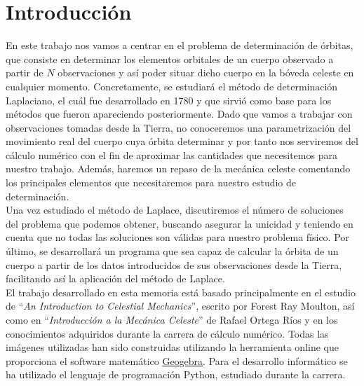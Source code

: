 \documentclass[11pt]{book}
\begin{document}

\thispagestyle{empty}

	\tableofcontents  %
	\thispagestyle{empty}
	\listoffigures    %
	\thispagestyle{empty}

\chapter{Introducción}
\label{chap:introduction}
En este trabajo nos vamos a centrar en el problema de determinación de órbitas, que consiste en determinar los elementos orbitales de un cuerpo observado a partir de $N$ observaciones y así poder situar dicho cuerpo en la bóveda celeste en cualquier momento. Concretamente, se estudiará el método de determinación Laplaciano, el cuál fue desarrollado en 1780 y que sirvió como base para los métodos que fueron apareciendo posteriormente.	Dado que vamos a trabajar con observaciones tomadas desde la Tierra, no conoceremos una parametrización del movimiento real del cuerpo cuya órbita determinar y por tanto nos serviremos del cálculo numérico con el fin de aproximar las cantidades que necesitemos para nuestro trabajo. Además, haremos un repaso de la mecánica celeste comentando los principales elementos que necesitaremos para nuestro estudio de determinación.\\

Una vez estudiado el método de Laplace, discutiremos el número de soluciones del problema que podemos obtener, buscando asegurar la unicidad y teniendo en cuenta que no todas las soluciones son válidas para nuestro problema físico. Por último, se desarrollará un programa que sea capaz de calcular la órbita de un cuerpo a partir de los datos introducidos de sus observaciones desde la Tierra, facilitando así la aplicación del método de Laplace.\\

El trabajo desarrollado en esta memoria está basado principalmente en el estudio de ``\textit{An Introduction to Celestial Mechanics}'', escrito por Forest Ray Moulton\cite{moulton}, así como en ``\textit{Introducción a la Mecánica Celeste}'' de Rafael Ortega Ríos\cite{ortega} y en los conocimientos adquiridos durante la carrera de cálculo numérico. Todas las imágenes utilizadas han sido construidas utilizando la herramienta online que proporciona el software matemático \href{https://www.geogebra.org/classic?lang=es}{Geogebra}. Para el desarrollo informático se ha utilizado el lenguaje de programación Python, estudiado durante la carrera.\\
\end{document}
